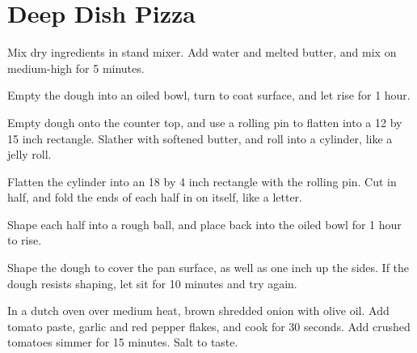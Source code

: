 \section{Deep Dish Pizza}
\begin{recipe}


Mix dry ingredients in stand mixer. Add water and melted butter, and mix on medium-high for 5 minutes.

Empty the dough into an oiled bowl, turn to coat surface, and let rise for 1 hour.

Empty dough onto the counter top, and use a rolling pin to flatten into a 12 by 15 inch rectangle. Slather with softened butter, and roll into a cylinder, like a jelly roll.

Flatten the cylinder into an 18 by 4 inch rectangle with the rolling pin. Cut in half, and fold the ends of each half in on itself, like a letter.

Shape each half into a rough ball, and place back into the oiled bowl for 1 hour to rise.

Shape the dough to cover the pan surface, as well as one inch up the sides. If the dough resists shaping, let sit for 10 minutes and try again.


In a dutch oven over medium heat, brown shredded onion with olive oil. Add tomato paste, garlic and red pepper flakes, and cook for 30 seconds. Add crushed tomatoes simmer for 15 minutes. Salt to taste.


\end{recipe}
